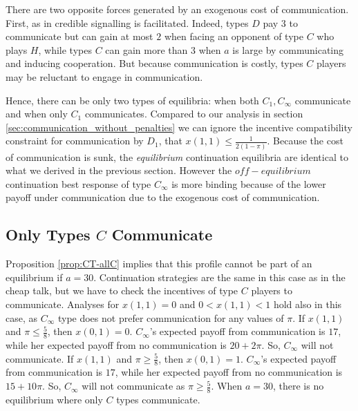 \documentclass[12pt]{article}
\theoremstyle{definition}
\theoremstyle{remark}
\begin{document}
There are two opposite forces generated by an exogenous cost of communication. First, as in \cite{Spence1973} credible signalling is facilitated. Indeed, types $D$ pay $3$ to communicate but can gain at most $2$ when facing an opponent of type $C$ who plays $H$, while types $C$ can gain more than $3$ when $a$ is large by communicating and inducing cooperation. But because communication is costly, types $C$ players may be reluctant to engage in communication. 

Hence, there can be only two types of equilibria: when both $C_1,C_\infty$ communicate and when only $C_1$ communicates. Compared to our analysis in section \ref{sec:communication_without_penalties} we can ignore the incentive compatibility constraint for communication by $D_1$, that $x(1,1)\leq \frac{1}{2(1-\pi)}$. Because the cost of communication is sunk, the \emph{equilibrium} continuation equilibria are identical to what we derived in the previous section. However the $off-equilibrium$ continuation best response of type $C_\infty$ is more binding because of the lower payoff under communication due to the exogenous cost of communication.


\subsection{Only Types $C$ Communicate}
Proposition \ref{prop:CT-allC} implies that this profile cannot be part of an equilibrium if $a=30$. Continuation strategies are the same in this case as in the cheap talk, but we have to check the incentives of type $C$ players to communicate. Analyses for $x(1,1)=0$ and $0<x(1,1)<1$ hold also in this case, as $C_\infty$ type does not prefer communication for any values of $\pi$. If $x(1,1)$ and $\pi\leq \frac{5}{8}$, then $x(0,1)=0$. $C_\infty$'s expected payoff from communication is $17$, while her expected payoff from no communication is $20+2\pi$. So, $C_\infty$ will not communicate. If $x(1,1)$ and $\pi\geq \frac{5}{8}$, then $x(0,1)=1$.  $C_\infty$'s expected payoff from communication is $17$, while her expected payoff from no communication is $15+10\pi$. So, $C_\infty$ will not communicate as $\pi\geq \frac{5}{8}$. When $a=30$, there is no equilibrium where only $C$ types communicate.
\end{document}
